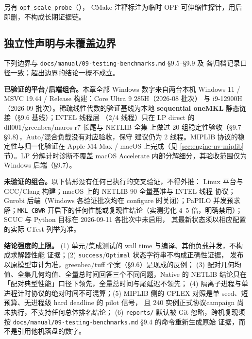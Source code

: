 另有 \texttt{opf\_scale\_probe}（），
CMake 注释标注为临时 OPF 可伸缩性探针，用后即删，不构成长期证据链。

\subsection{独立性声明与未覆盖边界}

\begin{boundarynote}
下列边界与 \texttt{docs/manual/09-testing-benchmarks.md} §9.5--§9.9 及
各归档记录口径一致；超出边界的结论一概不成立。
\end{boundarynote}

\textbf{已验证的平台/后端组合。}本章全部 Windows 数字来自两台本机
Windows 11 / MSVC 19.44 / Release 构建：Core Ultra 9 285H（2026-08 批次）
与 i9-12900H（2026-09 批次）。稀疏线性代数的验证基线为本地
\textbf{sequential oneMKL} 静态链接（§9.6 基线）；INTEL 线程层
（2/4 线程）只在 LP direct 的 dfl001/greenbea/maros-r7 长尾与 NETLIB 全集
上做过 20 组稳定性验收（§9.7--§9.8），Auto/混合负载没有对应验收，保守
建议仍为 2 线程。MIPLIB 协议的稳定性与归一化验证在 Apple M4 Max / macOS
上完成（见 \ref{sec:engine-nv-miplib} 节）。LP 分解计时诊断不覆盖 macOS
Accelerate 内部分解细分，其验收范围仅为 Windows 后端（§9.7）。

\textbf{未验证的组合。}以下情形没有任何已执行的交叉验证，不得外推：
Linux 平台与 GCC/Clang 构建；macOS 上的 NETLIB 90 全量基准与 INTEL 线程
协议；Gurobi 后端（Windows 各验证批次均在 configure 时关闭）；PaPILO
并发预求解；\texttt{MKL\_CBWR} 开启下的任何性能或复现性结论（实测劣化
4--5 倍，明确禁用）；SCUC 与 Python 目标在 2026-09-11 各批次中未启用，
其最新状态须以相应配置的实际 CTest 列举为准。

\textbf{结论强度的上限。}
(1) 单元/集成测试的 wall time 与编译、其他负载并发，不构成求解器性能
证据；(2) \texttt{success}/\texttt{Optimal} 状态字符串不构成正确性证据，
发布以原模型审计为准，greenbea/tuff 个案（§9.6）是现成的反例；
(3) 配对几何均值、全集几何均值、全量总时间回答三个不同问题，Native 的
NETLIB 结论只在「配对典型性能」口径下领先，全量总时间与尾延迟不领先；
(4) 隔离子进程与单进程计时协议的绝对时间不可混算；(5) MIPLIB 侧的
CPLEX 对照是单 seed、短预算、无进程级 hard deadline 的 pilot 信号，
且 240 实例正式协议campaign 尚未执行，不支持任何总体排名结论；
(6) \texttt{reports/} 默认被 Git 忽略，跨机复现须按
\texttt{docs/manual/09-testing-benchmarks.md} §9.4 的命令重新生成原始
证据，而不是引用他机落盘的数字。
